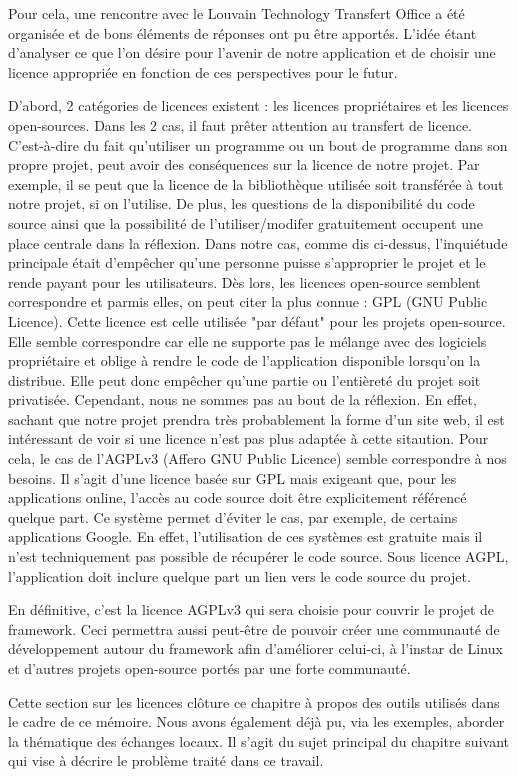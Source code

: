Pour cela,  une rencontre avec le Louvain Technology Transfert Office a été organisée et de bons éléments de réponses ont pu être apportés.   L'idée étant d'analyser ce que l'on désire pour l'avenir de notre application et de choisir une licence appropriée en fonction de ces perspectives pour le futur.

D'abord,  2 catégories de licences existent : les licences propriétaires et les licences open-sources.  Dans les 2 cas,  il faut prêter attention au transfert de licence.  C'est-à-dire du fait qu'utiliser un programme ou un bout de programme dans son propre projet,  peut avoir des conséquences sur la licence de notre projet.  Par exemple,  il se peut que la licence de la bibliothèque utilisée soit transférée à tout notre projet,  si on l'utilise.  De plus,  les questions de la disponibilité du code source ainsi que la possibilité de l'utiliser/modifer gratuitement occupent une place centrale dans la réflexion.  Dans notre cas,  comme dis ci-dessus,  l'inquiétude principale était d'empêcher qu'une personne puisse s'approprier le projet et le rende payant pour les utilisateurs.  Dès lors,  les licences open-source semblent correspondre et parmis elles,  on peut citer la plus connue : GPL (GNU Public Licence).  Cette licence est celle utilisée "par défaut" pour les projets open-source.  Elle semble correspondre car elle ne supporte pas le mélange avec des logiciels propriétaire et oblige à rendre le code de l'application disponible lorsqu'on la distribue.  Elle peut donc empêcher qu'une partie ou  l'entièreté du projet soit privatisée.  Cependant,  nous ne sommes pas au bout de la réflexion.  En effet,  sachant que notre projet prendra très probablement la forme d'un site web,  il est intéressant de voir si une licence n'est pas plus adaptée à cette sitaution.  Pour cela,  le cas de l'AGPLv3 (Affero GNU Public Licence) semble correspondre à nos besoins.  Il s'agit d'une licence basée sur GPL  mais exigeant que,  pour les applications online,  l'accès au code source doit être explicitement référencé quelque part.  Ce système permet d'éviter le cas,  par exemple,  de certains applications Google.  En effet,   l'utilisation de ces systèmes est gratuite mais il n'est techniquement pas possible de récupérer le code source.  Sous licence AGPL,  l'application doit inclure quelque part un lien vers le code source du projet.  

En définitive,  c'est la licence AGPLv3 qui sera choisie pour couvrir le projet de framework.  Ceci permettra aussi peut-être de pouvoir créer une communauté de développement autour du framework afin d'améliorer celui-ci,  à l'instar de Linux et d'autres projets open-source portés par une forte communauté.

Cette section sur les licences clôture ce chapitre à propos des outils utilisés dans le cadre de ce mémoire.  Nous avons également déjà pu,   via les exemples, aborder la thématique des échanges locaux.  Il s'agit du sujet principal du chapitre suivant qui vise à décrire le problème traité dans ce travail.